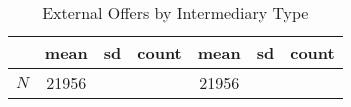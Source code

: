 \begin{table}[htbp]\centering
\def\sym#1{\ifmmode^{#1}\else\(^{#1}\)\fi}
\caption{External Offers by Intermediary Type}
\begin{tabular}{l*{2}{ccc}}
\hline\hline
            &        mean&          sd&       count&        mean&          sd&       count\\
\hline
\hline
\(N\)       &       21956&            &            &       21956&            &            \\
\hline\hline
\end{tabular}
\end{table}
